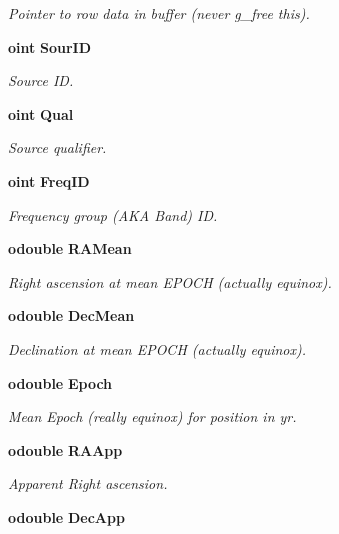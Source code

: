 \begin{CompactItemize}
\begin{CompactList}\small\item\em Pointer to row data in buffer (never g\_\-free this). \item\end{CompactList}\item 
{\bf oint} {\bf Sour\-ID}
\begin{CompactList}\small\item\em Source ID. \item\end{CompactList}\item 
{\bf oint} {\bf Qual}
\begin{CompactList}\small\item\em Source qualifier. \item\end{CompactList}\item 
{\bf oint} {\bf Freq\-ID}
\begin{CompactList}\small\item\em Frequency group (AKA Band) ID. \item\end{CompactList}\item 
{\bf odouble} {\bf RAMean}
\begin{CompactList}\small\item\em Right ascension at mean EPOCH (actually equinox). \item\end{CompactList}\item 
{\bf odouble} {\bf Dec\-Mean}
\begin{CompactList}\small\item\em Declination at mean EPOCH (actually equinox). \item\end{CompactList}\item 
{\bf odouble} {\bf Epoch}
\begin{CompactList}\small\item\em Mean Epoch (really equinox) for position in yr. \item\end{CompactList}\item 
{\bf odouble} {\bf RAApp}
\begin{CompactList}\small\item\em Apparent Right ascension. \item\end{CompactList}\item 
{\bf odouble} {\bf Dec\-App}

\end{CompactItemize}
